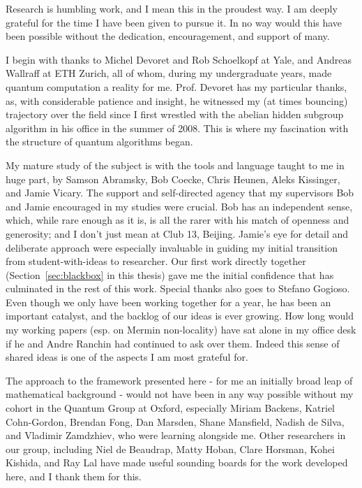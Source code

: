 \begin{acknowledgementslong}
Research is humbling work, and I mean this in the proudest way. I am deeply grateful for the time I have been given to pursue it.  In no way would this have been possible without the dedication, encouragement, and support of many.

I begin with thanks to Michel Devoret and Rob Schoelkopf at Yale, and Andreas Wallraff at ETH Zurich, all of whom, during my undergraduate years, made quantum computation a reality for me.  Prof. Devoret has my particular thanks, as, with considerable patience and insight, he witnessed my (at times bouncing) trajectory over the field since I first wrestled with the abelian hidden subgroup algorithm in his office in the summer of 2008. This is where my fascination with the structure of quantum algorithms began.

My mature study of the subject is with the tools and language taught to me in huge part, by Samson Abramsky, Bob Coecke, Chris Heunen, Aleks Kissinger, and Jamie Vicary. The support and self-directed agency that my supervisors Bob and Jamie encouraged in my studies were crucial. Bob has an independent sense, which, while rare enough as it is, is all the rarer with his match of openness and generosity; and I don't just mean at Club 13, Beijing. Jamie's eye for detail and deliberate approach were especially invaluable in guiding my initial transition from student-with-ideas to researcher. Our first work directly together (Section~\ref{sec:blackbox} in this thesis) gave me the initial confidence that has culminated in the rest of this work.  Special thanks also goes to Stefano Gogioso. Even though we only have been working together for a year, he has been an important catalyst, and the backlog of our ideas is ever growing.  How long would my working papers (esp. on Mermin non-locality) have sat alone in my office desk if he and Andre Ranchin had continued to ask over them. Indeed this sense of shared ideas is one of the aspects I am most grateful for. 

The approach to the framework presented here - for me an initially broad leap of mathematical background - would not have been in any way possible without my cohort in the Quantum Group at Oxford, especially Miriam Backens, Katriel Cohn-Gordon, Brendan Fong, Dan Marsden, Shane Mansfield, Nadish de Silva, and Vladimir Zamdzhiev, who were learning alongside me. Other researchers in our group, including Niel de Beaudrap, Matty Hoban, Clare Horsman, Kohei Kishida, and Ray Lal have made useful sounding boards for the work developed here, and I thank them for this.


\end{acknowledgementslong}
